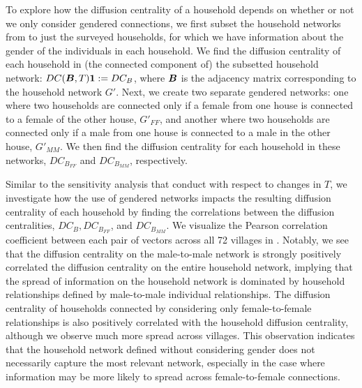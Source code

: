 To explore how the diffusion centrality of a household depends on whether or not we only consider gendered connections, we first subset the household networks from \cite{banerjee2013} to just the surveyed households, for which we have information about the gender of the individuals in each household. We find the diffusion centrality of each household in (the connected component of) the subsetted household network: $DC(\boldsymbol{B}, T) \mathbf{1} := DC_{B}$, where $\boldsymbol{B}$ is the adjacency matrix corresponding to the household network $G'$.
Next, we create two separate gendered networks: one where two households are connected only if a female from one house is connected to a female of the other house, $G'_{FF}$, and another where two households are connected only if a male from one house is connected to a male in the other house, $G'_{MM}$. We then find the diffusion centrality for each household in these networks, $DC_{B_{FF}}$ and $DC_{B_{MM}}$, respectively. 

Similar to the sensitivity analysis that \cite{banerjee2013} conduct \citep[see Table S7 in][]{banerjee2013} with respect to changes in $T$, we investigate how the use of gendered networks impacts the resulting diffusion centrality of each household by finding the correlations between the diffusion centralities, $DC_{B}, DC_{B_{FF}}$, and $DC_{B_{MM}}$. We visualize the Pearson correlation coefficient between each pair of vectors across all 72 villages in . Notably, we see that the diffusion centrality on the male-to-male network is strongly positively correlated the diffusion centrality on the entire household network, implying that the spread of information on the household network is dominated by household relationships defined by male-to-male individual relationships. The diffusion centrality of households connected by considering only female-to-female relationships is also positively correlated with the household diffusion centrality, although we observe much more spread across villages. This observation indicates that the household network defined without considering gender does not necessarily capture the most relevant network, especially in the case where information may be more likely to spread across female-to-female connections. 

